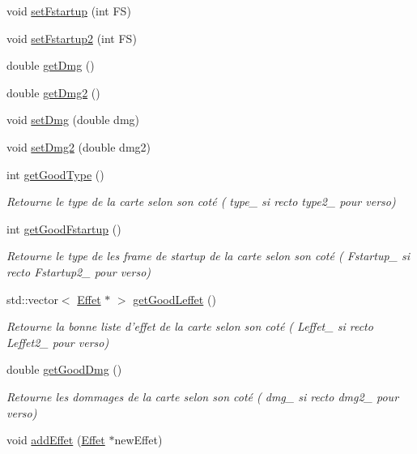 \begin{DoxyCompactItemize}
void \hyperlink{class_carte_ab3e508c3af45a3e5b38a397b003cc250}{set\-Fstartup} (int F\-S)
\item 
void \hyperlink{class_carte_a82c6e252c3225604e23977e3453af623}{set\-Fstartup2} (int F\-S)
\item 
double \hyperlink{class_carte_a6b831afaa8d2f723ecd642b92de536fb}{get\-Dmg} ()
\item 
double \hyperlink{class_carte_ac6e5febd328ba89c73d755b7edfc61ae}{get\-Dmg2} ()
\item 
void \hyperlink{class_carte_a496ea294465e9ba361ec759b2472da7e}{set\-Dmg} (double dmg)
\item 
void \hyperlink{class_carte_aedb1a92861dec58f566818795efc1e04}{set\-Dmg2} (double dmg2)
\item 
int \hyperlink{class_carte_ad1f2b50c5c627c11547282e88a912d44}{get\-Good\-Type} ()
\begin{DoxyCompactList}\small\item\em Retourne le type de la carte selon son coté ( type\-\_\- si recto type2\-\_\- pour verso) \end{DoxyCompactList}\item 
int \hyperlink{class_carte_a03c8b823ad97a064f6415eea63dcdd3d}{get\-Good\-Fstartup} ()
\begin{DoxyCompactList}\small\item\em Retourne le type de les frame de startup de la carte selon son coté ( Fstartup\-\_\- si recto Fstartup2\-\_\- pour verso) \end{DoxyCompactList}\item 
std\-::vector$<$ \hyperlink{class_effet}{Effet} $\ast$ $>$ \hyperlink{class_carte_aca394e9c23d6b9a8ab7d35e9362295f0}{get\-Good\-Leffet} ()
\begin{DoxyCompactList}\small\item\em Retourne la bonne liste d'effet de la carte selon son coté ( Leffet\-\_\- si recto Leffet2\-\_\- pour verso) \end{DoxyCompactList}\item 
double \hyperlink{class_carte_a3f437815a1d95bb70a9ede79c9f53348}{get\-Good\-Dmg} ()
\begin{DoxyCompactList}\small\item\em Retourne les dommages de la carte selon son coté ( dmg\-\_\- si recto dmg2\-\_\- pour verso) \end{DoxyCompactList}\item 
void \hyperlink{class_carte_ac59034763b08ced32db5d82d080f3ddc}{add\-Effet} (\hyperlink{class_effet}{Effet} $\ast$new\-Effet)

\end{DoxyCompactItemize}
